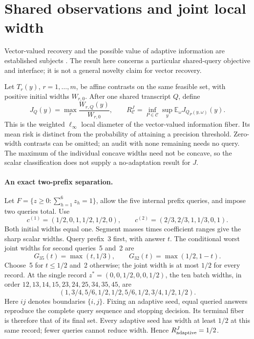 \section{Shared observations and joint local width}
\label{app:joint-width-boundary}
Vector-valued recovery and the possible value of adaptive information are
established subjects \citep{krieg2025}. The result here concerns a particular
shared-query objective and interface; it is not a general novelty claim for
vector recovery.

Let $T_r(y)$, $r=1,\ldots,m$, be affine contrasts on the same feasible set,
with positive initial widths $W_{r,0}$. After one shared transcript $Q$, define
\[
 J_Q(y)=\max_r\frac{W_{r,Q}(y)}{W_{r,0}},\qquad
 R_{\mathcal C}^{J}=\inf_{P\in\mathcal C}\sup_y
                  \mathbb E_\omega J_{Q_P(y,\omega)}(y).
\]
This is the weighted $\ell_\infty$ local diameter of the vector-valued
information fiber. Its mean risk is distinct from the probability of
attaining a precision threshold. Zero-width contrasts can be omitted;
an audit with none remaining needs no query. The maximum of the individual
concave widths need not be concave, so the scalar classification does not
supply a no-adaptation result for $J$.

\paragraph{An exact two-prefix separation.}
Let $F=\{z\geq0:\sum_{h=1}^6z_h=1\}$, allow the five internal prefix
queries, and impose two queries total. Use
\[
 c^{(1)}=(1/2,0,1,1/2,1/2,0),\qquad
 c^{(2)}=(2/3,2/3,1,1/3,0,1).
\]
Both initial widths equal one. Segment masses times coefficient ranges give
the sharp scalar widths. Query prefix~3 first, with answer $t$. The
conditional worst joint widths for second queries~5 and~2 are
\[
 G_{35}(t)=\max(t,1/3),\qquad
 G_{32}(t)=\max(1/2,1-t).
\]
Choose~5 for $t\leq1/2$ and~2 otherwise; the joint width is at most $1/2$
for every record. At the single record $z^*=(0,0,1/2,0,0,1/2)$, the ten
batch widths, in order $12,13,14,15,23,24,25,34,35,45$, are
\[
 (1,3/4,5/6,1/2,1/2,5/6,1/2,3/4,1/2,1/2).
\]
Here $ij$ denotes boundaries $\{i,j\}$. Fixing an adaptive seed, equal
queried answers reproduce the complete query sequence and stopping decision.
Its terminal fiber is therefore that of its final set. Every adaptive seed
has width at least $1/2$ at this same record; fewer queries cannot reduce
width. Hence $R_{\rm adaptive}^{J}=1/2$.

